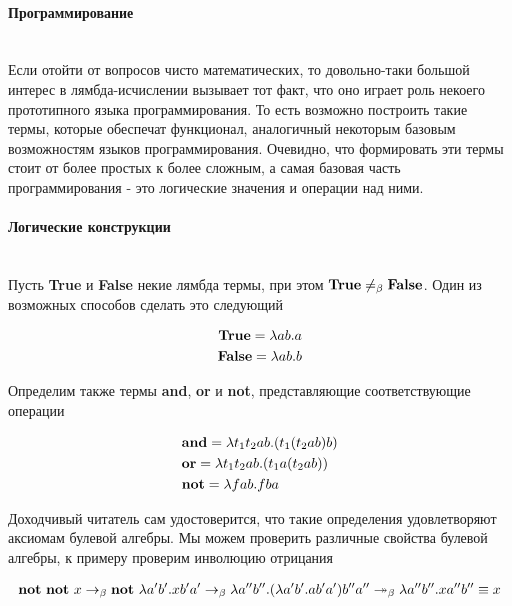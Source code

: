 \documentclass[lambda.tex]{subfiles}
\begin{document}
\paragraph{Программирование} %
\label{par:programming_intro}~\\

Если отойти от вопросов чисто математических, то довольно-таки большой интерес в лямбда-исчислении вызывает тот факт, что оно играет роль некоего прототипного языка программирования.
То есть возможно построить такие термы, которые обеспечат функционал, аналогичный некоторым базовым возможностям языков программирования.
Очевидно, что формировать эти термы стоит от более простых к более сложным, а самая базовая часть программирования - это логические значения и операции над ними.

\paragraph{Логические конструкции} %
\label{par:bolean}
~\\

Пусть \textbf{True} и \textbf{False} некие лямбда термы, при этом $\text{\textbf{True}} \neq_\beta \text{\textbf{False}}$. Один из возможных способов сделать это следующий

\begin{align*}
\text{\textbf{True}} = \lambda a b.a\\
\text{\textbf{False}} = \lambda a b.b
\end{align*}

Определим также термы \textbf{and}, \textbf{or} и \textbf{not}, представляющие соответствующие операции

\begin{align*}
&\text{\textbf{and}} = \lambda t_1 t_2 a b . (t_1 (t_2 a b) b)\\
&\text{\textbf{or}} = \lambda t_1 t_2 a b.(t_1 a (t_2 a b))\\
&\text{\textbf{not}} = \lambda f a b . f b a
\end{align*}

Доходчивый читатель сам удостоверится, что такие определения удовлетворяют аксиомам булевой алгебры.
Мы можем проверить различные свойства булевой алгебры, к примеру проверим инволюцию отрицания

\begin{align*}
	\text{\textbf{not}}\ \text{\textbf{not}}\ x \rightarrow_\beta
	\text{\textbf{not}}\ \lambda a' b' . x b' a' \rightarrow_\beta
	\lambda a'' b'' . (\lambda a' b' . a b' a') b'' a'' \twoheadrightarrow_\beta
	\lambda a'' b'' . x a'' b'' \equiv x
\end{align*}
\end{document}
